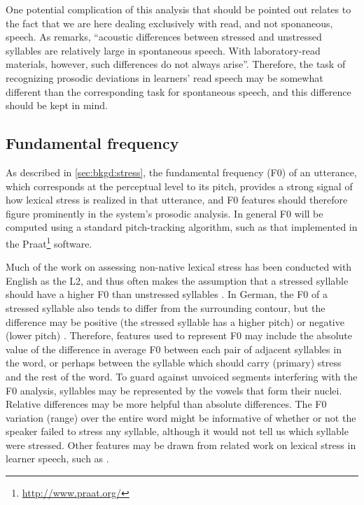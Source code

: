 	One potential complication of this analysis that should be pointed out relates to the fact that we are here dealing exclusively with read, and not sponaneous, speech. As \textcite[p.~275]{Cutler2005} remarks, ``acoustic differences between stressed and unstressed syllables are relatively large in spontaneous speech. With laboratory-read materials, however, such differences do not always arise''. Therefore, the task of recognizing prosodic deviations in learners' read speech may be somewhat different than the corresponding task for spontaneous speech, and this difference should be kept in mind. 

	\subsection{Fundamental frequency}
	\label{sec:prosody:f0}
	As described in \cref{sec:bkgd:stress}, the fundamental frequency (F0) of an utterance, which corresponds at the perceptual level to its pitch, provides a strong signal of how lexical stress is realized in that utterance, and F0 features should therefore figure prominently in the system's prosodic analysis. In general F0 will be computed using a standard pitch-tracking algorithm, such as that implemented in the Praat\footnote{\url{http://www.praat.org/}} software.
	
	Much of the work on assessing non-native lexical stress has been conducted with English as the L2, and thus often makes the assumption that a stressed syllable should have a higher F0 than unstressed syllables \citep{Bonneau2011}. In German, the F0 of a stressed syllable also tends to differ from the surrounding contour, but the difference may be positive (the stressed syllable has a higher pitch) or negative (lower pitch) \citep[p.~267]{Cutler2005}. Therefore, features used to represent F0 may include the absolute value of the difference in average F0 between each pair of adjacent syllables in the word, or perhaps between the syllable which should carry (primary) stress and the rest of the word. To guard against unvoiced segments interfering with the F0 analysis, syllables may be represented by the vowels that form their nuclei. Relative differences may be more helpful than absolute differences. The F0 variation (range) over the entire word might be informative of whether or not the speaker failed to stress any syllable, although it would not tell us which syllable were stressed. Other features may be drawn from related work on lexical stress in learner speech, such as \textcite{Bonneau2011}.
	

